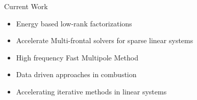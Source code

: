 \documentclass{beamer}
\begin{document}
\begin{frame}{Current Work}
	\begin{itemize}
		\item
		Energy based low-rank factorizations
		\item
		Accelerate Multi-frontal solvers for sparse linear systems
		\item
		High frequency Fast Multipole Method
		\item
		Data driven approaches in combustion
		\item
		Accelerating iterative methods in linear systems
	\end{itemize}
\end{frame}
\end{document}

